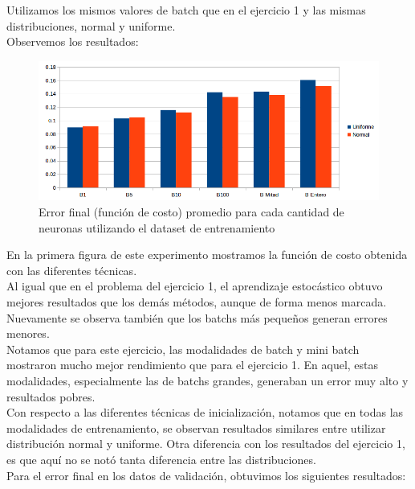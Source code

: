 Utilizamos los mismos valores de batch que en el ejercicio 1 y las mismas distribuciones, normal y uniforme.\\
Observemos los resultados:

\begin{figure}[h]
  \begin{center}
  \includegraphics[scale=0.65]{graficos/ej2_distribucion_error_final.png}
  \caption{Error final (función de costo) promedio para cada cantidad de neuronas utilizando el dataset de entrenamiento}
  \end{center}
\end{figure}

En la primera figura de este experimento mostramos la función de costo obtenida con las diferentes técnicas.\\

Al igual que en el problema del ejercicio 1, el aprendizaje estocástico obtuvo mejores resultados que los demás métodos, aunque de forma menos marcada. Nuevamente se observa también que los batchs más pequeños generan errores menores. \\

Notamos que para este ejercicio, las modalidades de batch y mini batch mostraron mucho mejor rendimiento que para el ejercicio 1. En aquel, estas modalidades, especialmente las de batchs grandes, generaban un error muy alto y resultados pobres.\\

Con respecto a las diferentes técnicas de inicialización, notamos que en todas las modalidades de entrenamiento, se observan resultados similares entre utilizar distribución normal y uniforme. Otra diferencia con los resultados del ejercicio 1, es que aquí no se notó tanta diferencia entre las distribuciones.\\

Para el error final en los datos de validación, obtuvimos los siguientes resultados:\\

